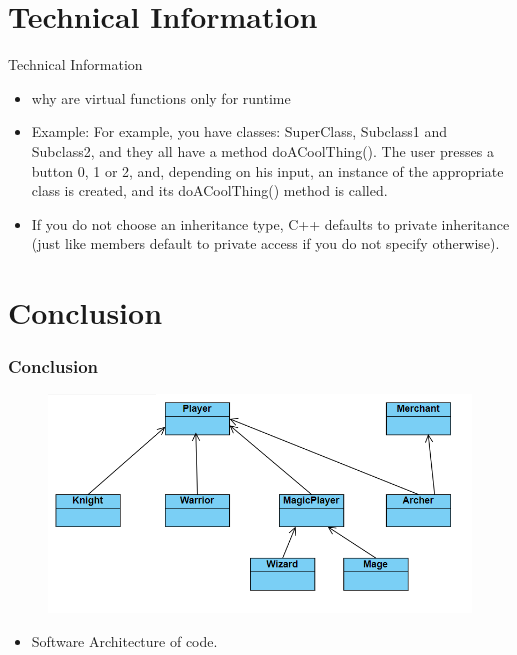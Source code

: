 \documentclass{beamer}
\begin{document}
\section{Technical Information}
\begin{frame}{Technical Information}
\begin{itemize}
\item why are virtual functions only for runtime
\item Example: For example, you have classes: SuperClass, Subclass1 and Subclass2, and they 
all have a method doACoolThing(). The user presses a button 0, 1 or 2, and,
depending on his input, an instance of the appropriate class is created, and
its doACoolThing() method is called.
\item If you do not choose an inheritance type, C++ defaults to private inheritance (just like members default to private access if you do not specify otherwise).
\end{itemize}  
\end{frame}


\section{Conclusion}
\begin{frame}\frametitle{Conclusion}
\begin{figure}
    \includegraphics[width=12cm]{code.png}
\end{figure}
\begin{itemize}
\item Software Architecture of code. 
\end{itemize}
\end{frame}


\end{document}
